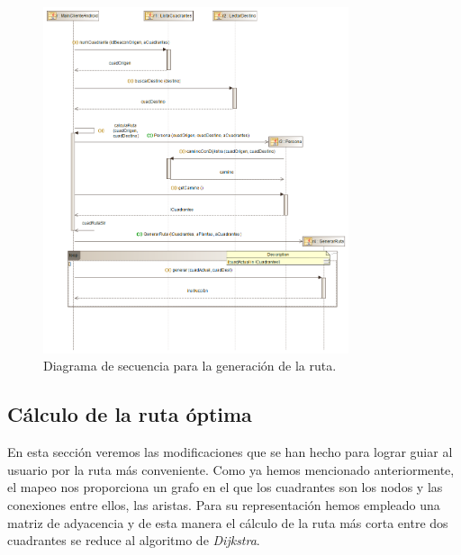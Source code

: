 \begin{figure}[t]
	\centering
	\includegraphics[width=0.8\textwidth]{Imagenes/Capitulo4/diagramasUML/generacionRuta}
	\caption{Diagrama de secuencia para la generación de la ruta.}
	\label{fig:diag_sec_conexionYRutaServ}
\end{figure}



\subsection{Cálculo de la ruta óptima}
\label{sub:rutaOptima}

En esta sección veremos las modificaciones que se han hecho para lograr guiar al usuario por la ruta más conveniente. Como ya hemos mencionado anteriormente, el mapeo nos proporciona un grafo en el que los cuadrantes son los nodos y las conexiones entre ellos, las aristas. Para su representación hemos empleado una matriz de adyacencia y de esta manera el cálculo de la ruta más corta entre dos cuadrantes se reduce al algoritmo de \textit{Dijkstra}.


